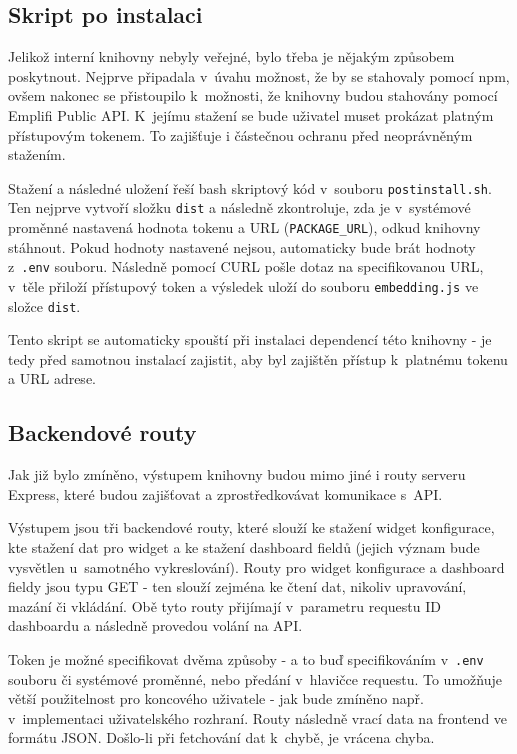 \documentclass[czech, bc, kiv, he, iso690numb]{fasthesis}
\begin{document}
\subsection{Skript po instalaci}

Jelikož interní knihovny nebyly veřejné, bylo třeba je nějakým způsobem poskytnout. Nejprve připadala v~úvahu možnost, že by se stahovaly pomocí npm, ovšem
nakonec se přistoupilo k~možnosti, že knihovny budou stahovány pomocí Emplifi Public API. K~jejímu stažení se bude uživatel muset prokázat platným přístupovým tokenem.
To zajišťuje i částečnou ochranu před neoprávněným stažením.

Stažení a následné uložení řeší bash skriptový kód v~souboru \texttt{postinstall.sh}. Ten nejprve vytvoří složku \texttt{dist} a následně zkontroluje, zda je v~systémové proměnné
nastavená hodnota tokenu a URL (\texttt{PACKAGE\_URL}), odkud knihovny stáhnout. Pokud hodnoty nastavené nejsou, automaticky bude brát hodnoty z~\texttt{.env} souboru. Následně pomocí CURL pošle dotaz na
specifikovanou URL, v~těle přiloží přístupový token a výsledek uloží do souboru \texttt{embedding.js} ve složce \texttt{dist}.

Tento skript se automaticky spouští při instalaci dependencí této knihovny - je tedy před samotnou instalací zajistit, aby byl zajištěn přístup k~platnému tokenu a URL adrese.

\subsection{Backendové routy}

Jak již bylo zmíněno, výstupem knihovny budou mimo jiné i routy serveru Express, které budou zajišťovat a zprostředkovávat komunikace s~API.

Výstupem jsou tři backendové routy, které slouží ke stažení widget konfigurace, kte stažení dat pro widget a ke stažení dashboard fieldů (jejich význam bude vysvětlen u~samotného vykreslování).
Routy pro widget konfigurace a dashboard fieldy jsou typu GET - ten slouží zejména ke čtení dat, nikoliv upravování, mazání či vkládání. Obě tyto routy přijímají v~parametru requestu ID
dashboardu a následně provedou volání na API. 

Token je možné specifikovat dvěma způsoby - a to buď specifikováním v~\texttt{.env} souboru či systémové proměnné, nebo předání v~hlavičce requestu. To umožňuje větší použitelnost pro koncového
uživatele - jak bude zmíněno např. v~implementaci uživatelského rozhraní. Routy následně vrací data na frontend ve formátu JSON. Došlo-li při fetchování dat k~chybě, je vrácena chyba.
\end{document}

